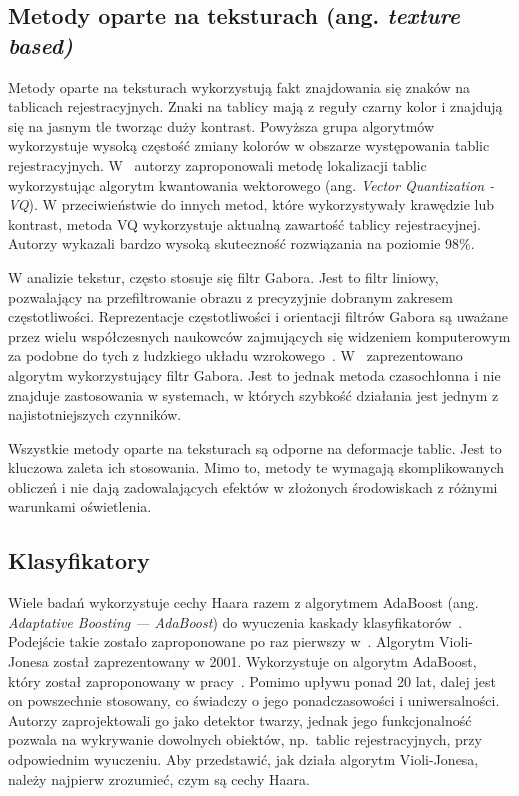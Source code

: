 \subsection{Metody oparte na teksturach (ang. \textit{texture based)}}
\label{subsec:metody-oparte-na-teksturach}
Metody oparte na teksturach wykorzystują fakt znajdowania się znaków na tablicach rejestracyjnych.
Znaki na tablicy mają z reguły czarny kolor i znajdują się na jasnym tle tworząc duży kontrast.
Powyższa grupa algorytmów wykorzystuje wysoką częstość zmiany kolorów w obszarze występowania tablic rejestracyjnych.
W~\cite{824138} autorzy zaproponowali metodę lokalizacji tablic wykorzystując algorytm kwantowania wektorowego (ang. \textit{Vector Quantization - VQ}).
W przeciwieństwie do innych metod, które wykorzystywały krawędzie lub kontrast, metoda VQ wykorzystuje aktualną zawartość tablicy rejestracyjnej.
Autorzy wykazali bardzo wysoką skuteczność rozwiązania na poziomie 98\%.

W analizie tekstur, często stosuje się filtr Gabora.
Jest to filtr liniowy, pozwalający na przefiltrowanie obrazu z precyzyjnie dobranym zakresem częstotliwości.
Reprezentacje częstotliwości i orientacji filtrów Gabora są uważane przez wielu współczesnych naukowców zajmujących się widzeniem komputerowym za podobne do tych z ludzkiego układu wzrokowego~\cite{gabor_human_eye}.
W~\cite{gabor_lpr} zaprezentowano algorytm wykorzystujący filtr Gabora.
Jest to jednak metoda czasochłonna i nie znajduje zastosowania w systemach, w których szybkość działania jest jednym z najistotniejszych czynników.

Wszystkie metody oparte na teksturach są odporne na deformacje tablic.
Jest to kluczowa zaleta ich stosowania.
Mimo to, metody te wymagają skomplikowanych obliczeń i nie dają zadowalających efektów w złożonych środowiskach z różnymi warunkami oświetlenia.

\subsection{Klasyfikatory}\label{subsec:klasyfikatory}
Wiele badań wykorzystuje cechy Haara razem z algorytmem AdaBoost (ang. \textit{Adaptative Boosting --- AdaBoost}) do wyuczenia kaskady klasyfikatorów~\cite{9310202}.
Podejście takie zostało zaproponowane po raz pierwszy w~\cite{990517}.
Algorytm Violi-Jonesa został zaprezentowany \linebreak w 2001.
Wykorzystuje on algorytm AdaBoost, który został zaproponowany w pracy~\cite{Freund1996ExperimentsWA}.
Pomimo upływu ponad 20 lat, dalej jest on powszechnie stosowany, co świadczy o jego ponadczasowości i uniwersalności.
Autorzy zaprojektowali go jako detektor twarzy, jednak jego funkcjonalność pozwala na wykrywanie dowolnych obiektów, np.\ tablic rejestracyjnych, przy odpowiednim wyuczeniu.
Aby przedstawić, jak działa algorytm Violi-Jonesa, należy najpierw zrozumieć, czym są cechy Haara.

